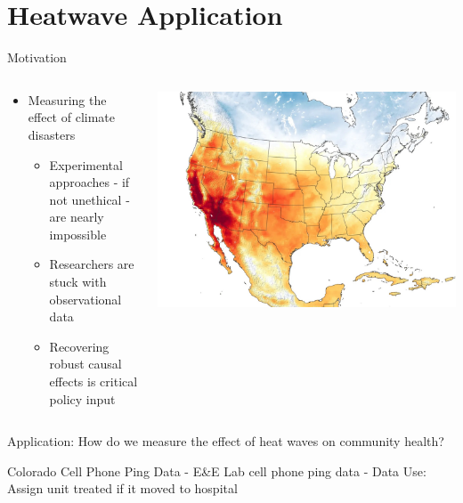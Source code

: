 \section{Heatwave Application}

\begin{frame}{Motivation}

  \begin{columns}
    \begin{column}{0.6\linewidth}
      \begin{itemize}
        \item Measuring the effect of climate disasters
            \begin{itemize}
            \item Experimental approaches - if not unethical - are nearly impossible
            \item Researchers are stuck with observational data
            \item Recovering robust causal effects is critical policy input
            \end{itemize}
      \end{itemize}
    \end{column}
    \begin{column}{0.4\linewidth}
      \includegraphics[scale=0.1]{figures/california-heatwave-2020-nasa-eo.jpeg}
      \caption{}
    \end{column}
  \end{columns}

\vspace{7pt}
\begin{center}
    Application: How do we measure the effect of heat waves on community health?
\end{center}


\end{frame}

\begin{frame}{Colorado Cell Phone Ping Data}
- E&E Lab cell phone ping data
- Data Use: Assign unit treated if it moved to hospital
\end{frame}